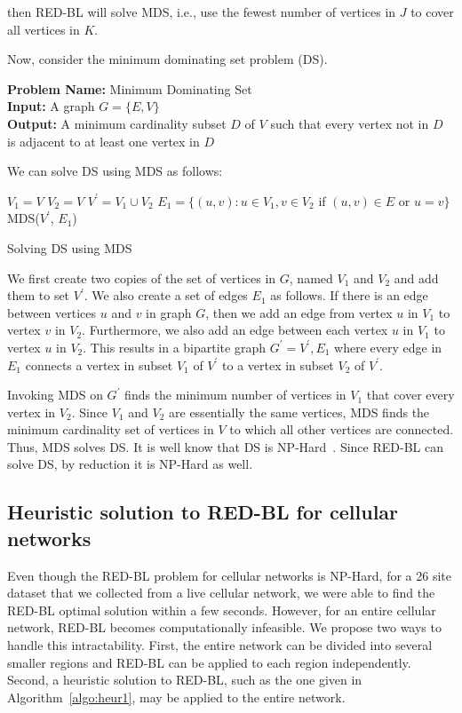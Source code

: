 then RED-BL will solve MDS, i.e., use the fewest number of vertices in $J$ to cover all vertices in $K$.

Now, consider the minimum dominating set problem (DS).
\medskip

\noindent
\textbf{Problem Name:} Minimum Dominating Set\\
\textbf{Input:} A graph $G=\{E,V\}$\\
\textbf{Output:} A minimum cardinality subset $D$ of $V$ such that every vertex not in $D$ is adjacent to at least one vertex in $D$

We can solve DS using MDS as follows:
\IncMargin{1em}
\LinesNumbered
\begin{algorithm}
 $V_1 = V$\;
 $V_2 = V$\;
 $V^{\prime} = V_1 \cup V_2$\;
 $E_1 = \{(u, v): u \in V_1, v \in V_2$ if $(u, v) \in E$ or $u = v\}$\;
 MDS($V^{\prime}$, $E_1$)\;
\caption{Solving DS using MDS}
\label{algo:proof}
\end{algorithm}
\DecMargin{1em}

We first create two copies of the set of vertices in $G$, named $V_1$ and $V_2$ and add them to set $V^{\prime}$. We also create a set of edges $E_1$ as follows. If there is an edge between vertices $u$ and $v$ in graph $G$, then we add an edge from vertex $u$ in $V_1$ to vertex $v$ in $V_2$. Furthermore, we also add an edge between each vertex $u$ in $V_1$ to vertex $u$ in $V_2$. This results in a bipartite graph $G^{\prime}={V^{\prime}, E_1}$ where every edge in $E_1$ connects a vertex in subset $V_1$ of $V^{\prime}$ to a vertex in subset $V_2$ of $V^{\prime}$.

Invoking MDS on $G^{\prime}$ finds the minimum number of vertices in $V_1$ that cover every vertex in $V_2$. Since $V_1$ and $V_2$ are essentially the same vertices, MDS finds the minimum cardinality set of vertices in $V$ to which all other vertices are connected. Thus, MDS solves DS. It is well know that DS is NP-Hard~\cite{Liedloff:2008:FDS:1390853.1390871}. Since RED-BL can solve DS, by reduction it is NP-Hard as well.

\subsection{Heuristic solution to RED-BL for cellular networks}
\label{subsec:heuristics} Even though the RED-BL problem for cellular networks is NP-Hard, for a 26 site dataset that we collected from a live cellular network, we were able to find the RED-BL optimal solution within a few seconds.
However, for an entire cellular network, RED-BL becomes computationally infeasible.
We propose two ways to handle this intractability. First, the entire network can be divided into several smaller regions and RED-BL can be applied to each region independently.
Second, a heuristic solution to RED-BL, such as the one given in Algorithm~\ref{algo:heur1}, may be applied to the entire network.

